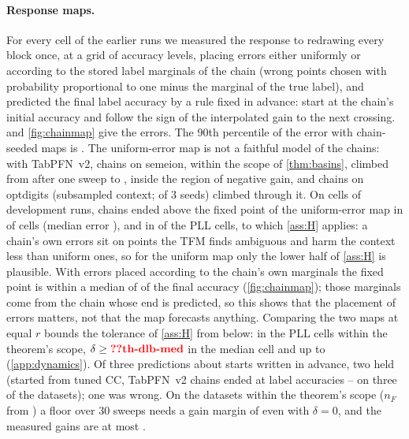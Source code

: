 \paragraph{Response maps.} For every cell of the earlier runs we measured the response to redrawing every block once,
at a grid of accuracy levels, placing errors either uniformly or according to the stored label marginals of the chain (wrong points chosen
with probability proportional to one minus the marginal of the true label), and predicted the final label accuracy by a
rule fixed in advance: start at the chain's initial accuracy and follow the sign of the interpolated gain to the next
crossing.  and \cref{fig:chainmap} give the errors. The 90th percentile of the error with
chain-seeded maps is .
The uniform-error map is not a faithful model of the chains: with TabPFN~v2, chains on semeion, within the scope of
\cref{thm:basins}, climbed from  after one sweep to , inside
the region of negative gain, and chains on optdigits (subsampled context;  of 3 seeds) climbed
through it. On  cells of development runs, chains ended above the fixed point of the uniform-error map in
 of cells (median error ), and in  of the
 PLL cells, to which \cref{ass:H} applies: a chain's own errors sit on points the TFM finds ambiguous
and harm the context less than uniform ones, so for the uniform map only the lower half of \cref{ass:H} is plausible.
With errors placed according to the chain's own marginals the fixed point is within a median of  of the
final accuracy (\cref{fig:chainmap}); those marginals come from the chain whose end is predicted, so this shows that the
placement of errors matters, not that the map forecasts anything. Comparing the two maps at equal $r$ bounds the
tolerance of \cref{ass:H} from below: in the  PLL cells within the theorem's scope,
$\delta\ge\val{th-dlb-med}$ in the median cell and up to  (\cref{app:dynamics}). Of three predictions
about starts written in advance, two held (started from tuned CC, TabPFN~v2 chains ended at label accuracies
-- on three of the datasets); one was wrong. On the  datasets within the
theorem's scope ($n_F$ from ) a floor over 30 sweeps needs a gain margin of  even
with $\delta=0$, and the measured gains are at most .

